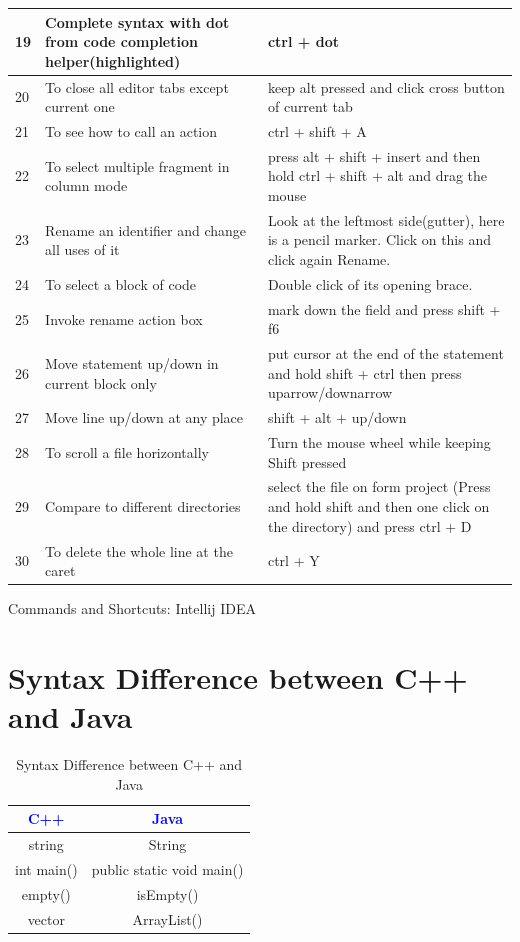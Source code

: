 \documentclass[10 pt]{book}
\begin{document}
\begin{center}
\begin{longtable}{|| m{1 em} || m{15 em} m{17 em} ||}
		\hline
		19 & Complete syntax with dot from code completion helper(highlighted) & ctrl + dot\\
		\hline
		20 & To close all editor tabs except current one & keep alt pressed and click cross button of current tab\\
		\hline
		21 & To see how to call an action & ctrl + shift + A\\
		\hline
		22 & To select multiple fragment in column mode & press alt + shift + insert and then hold ctrl + shift + alt and drag the mouse\\
		\hline
		23 & Rename an identifier and change all uses of it & Look at the leftmost side(gutter), here is a pencil marker. Click on this and click again Rename.\\
		\hline
		24 & To select a block of code & Double click of its opening brace.\\
		\hline
		25 & Invoke rename action box & mark down the field and press shift + f6\\
		\hline
		26 & Move statement up/down in current block only & put cursor at the end of the statement and hold shift + ctrl then press uparrow/downarrow\\
		\hline
		27 & Move line up/down at any place & shift + alt + up/down\\
		\hline
		28 & To scroll a file horizontally & Turn the mouse wheel while keeping Shift pressed\\
		\hline
		29 & Compare to different directories & select the file on form project (Press and hold shift and then one click on the directory) and press ctrl + D\\
		\hline
		30 & To delete the whole line at the caret & ctrl + Y\\
		\hline\hline
	\end{longtable}
	\caption{Commands and Shortcuts: Intellij IDEA}
\end{center}

\section{Syntax Difference between \textcolor{blue!90}{C++} and \textcolor{blue!90}{Java}}
\begin{table}[h!] %
	\centering
	\begin{tabular}{|| c | c ||}
		\hline
		\textbf{\textcolor{blue}{C++}} & \textbf{\textcolor{blue}{Java}}\\
		\hline\hline
		string & String\\
		\hline
		int main() & public static void main()\\
		\hline
		empty() & isEmpty()\\
		\hline
		vector & ArrayList()\\
		\hline
	\end{tabular}
	\caption{Syntax Difference between \textcolor{blue!90}{\huge C++} and \textcolor{blue!90}{\huge Java}}
\end{table}
\end{document}
